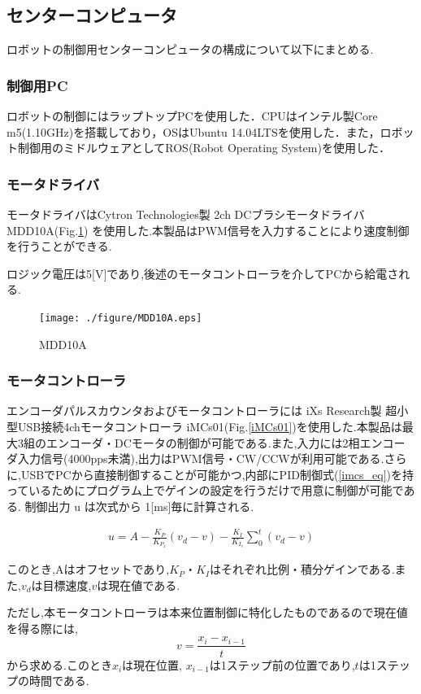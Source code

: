 \subsection{センターコンピュータ}
\par ロボットの制御用センターコンピュータの構成について以下にまとめる.
\subsubsection{制御用PC}
\par ロボットの制御にはラップトップPCを使用した．CPUはインテル製Core m5(1.10GHz)を搭載しており，OSはUbuntu 14.04LTSを使用した．また，ロボット制御用のミドルウェアとしてROS(Robot Operating System)を使用した．
\subsubsection{モータドライバ}

\par モータドライバはCytron Technologies製 2ch DCブラシモータドライバ MDD10A(Fig.\ref{MDD10A})
を使用した.本製品はPWM信号を入力することにより速度制御を行うことができる.
\par ロジック電圧は5[V]であり,後述のモータコントローラを介してPCから給電される.

\begin{figure}[hb]
	\centering
	\texttt{[image: ./figure/MDD10A.eps]}
	\caption{MDD10A}
	\label{MDD10A}
\end{figure}
\newpage
\subsubsection{モータコントローラ}
\par エンコーダパルスカウンタおよびモータコントローラには iXs Research製 超小型USB接続4chモータコントローラ iMCs01(Fig.\ref{iMCs01})を使用した.本製品は最大3組のエンコーダ・DCモータの制御が可能である.また,入力には2相エンコーダ入力信号(4000pps未満),出力はPWM信号・CW/CCWが利用可能である.さらに,USBでPCから直接制御することが可能かつ,内部にPID制御式(\ref{imcs_eq})を持っているためにプログラム上でゲインの設定を行うだけで用意に制御が可能である.
制御出力 u は次式から 1[ms]毎に計算される.

\begin{eqnarray}
	u=A-\frac{K_P}{K_{P_x}}(v_d - v)%
	-\frac{K_I}{K_{I_v}}\sum_0^t (v_d-v)
\label{imcs_eq}
\end{eqnarray}

このとき,Aはオフセットであり,$K_P・K_I$はそれぞれ比例・積分ゲインである.また,$v_d$は目標速度,$v$は現在値である.\\
\par ただし,本モータコントローラは本来位置制御に特化したものであるので現在値を得る際には,
\begin{equation}
	v = \frac{x_i - x_{i-1}}{t}
\end{equation}
から求める.このとき$x_i$は現在位置, $x_{i-1}$は1ステップ前の位置であり,$t$は1ステップの時間である.

